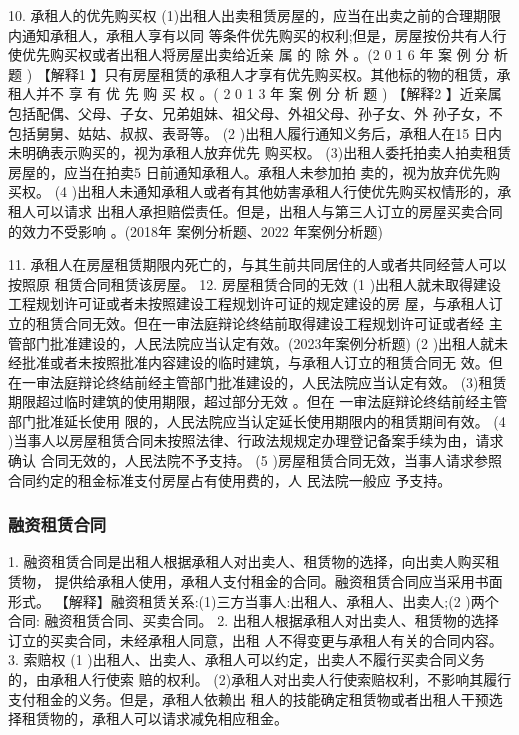 \documentclass[UTF8,12pt]{ctexart}
\numberwithin{equation}{section} %
\numberwithin{figure}{section}
\numberwithin{table}{section}
\begin{document}
	10. 承租人的优先购买权 (1)出租人出卖租赁房屋的，应当在出卖之前的合理期限内通知承租人，承租人享有以同 等条件优先购买的权利;但是，房屋按份共有人行使优先购买权或者出租人将房屋出卖给近亲 属 的 除 外 。(2 0 1 6 年 案 例 分 析 题 )
	【解释1 】只有房屋租赁的承租人才享有优先购买权。其他标的物的租赁，承租人并不 享 有 优 先 购 买 权 。( 2 0 1 3 年 案 例 分 析 题 )
	【解释2 】近亲属包括配偶、父母、子女、兄弟姐妹、祖父母、外祖父母、孙子女、外 孙子女，不包括舅舅、姑姑、叔叔、表哥等。
	(2 )出租人履行通知义务后，承租人在15 日内未明确表示购买的，视为承租人放弃优先 购买权。
	(3)出租人委托拍卖人拍卖租赁房屋的，应当在拍卖5 日前通知承租人。承租人未参加拍 卖的，视为放弃优先购买权。
	(4 )出租人未通知承租人或者有其他妨害承租人行使优先购买权情形的，承租人可以请求 出租人承担赔偿责任。但是，出租人与第三人订立的房屋买卖合同的效力不受影响 。(2018年 案例分析题、2022 年案例分析题)
	
	
	11. 承租人在房屋租赁期限内死亡的，与其生前共同居住的人或者共同经营人可以按照原 租赁合同租赁该房屋。
	12. 房屋租赁合同的无效
	(1 )出租人就未取得建设 工程规划许可证或者未按照建设工程规划许可证的规定建设的房 屋，与承租人订立的租赁合同无效。但在一审法庭辩论终结前取得建设工程规划许可证或者经 主管部门批准建设的，人民法院应当认定有效。(2023年案例分析题)
	(2 )出租人就未经批准或者未按照批准内容建设的临时建筑，与承租人订立的租赁合同无 效。但在一审法庭辩论终结前经主管部门批准建设的，人民法院应当认定有效。
	(3)租赁期限超过临时建筑的使用期限，超过部分无效 。但在 一审法庭辩论终结前经主管 部门批准延长使用 限的，人民法院应当认定延长使用期限内的租赁期间有效。
	(4 )当事人以房屋租赁合同未按照法律、行政法规规定办理登记备案手续为由，请求确认 合同无效的，人民法院不予支持。
	(5 )房屋租赁合同无效，当事人请求参照合同约定的租金标准支付房屋占有使用费的，人 民法院一般应 予支持。
	
	
	\subsubsection{融资租赁合同}
	
	1. 融资租赁合同是出租人根据承租人对出卖人、租赁物的选择，向出卖人购买租赁物， 提供给承租人使用，承租人支付租金的合同。融资租赁合同应当采用书面形式。
	【解释】融资租赁关系:(1)三方当事人:出租人、承租人、出卖人;(2 )两个合同: 融资租赁合同、买卖合同。
	2. 出租人根据承租人对出卖人、租赁物的选择订立的买卖合同，未经承租人同意，出租 人不得变更与承租人有关的合同内容。
	3. 索赔权
	(1 )出租人、出卖人、承租人可以约定，出卖人不履行买卖合同义务的，由承租人行使索 赔的权利。 (2)承租人对出卖人行使索赔权利，不影响其履行支付租金的义务。但是，承租人依赖出 租人的技能确定租赁物或者出租人干预选择租赁物的，承租人可以请求减免相应租金。
	
\end{document}
